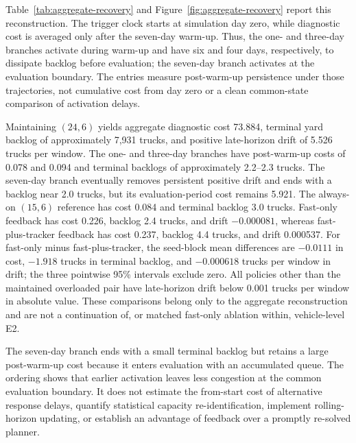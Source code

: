 \documentclass[preprint,12pt,authoryear,a4paper]{elsarticle}
\begin{document}
Table~\ref{tab:aggregate-recovery} and Figure~\ref{fig:aggregate-recovery} report this reconstruction. The trigger clock starts at simulation day zero, while diagnostic cost is averaged only after the seven-day warm-up. Thus, the one- and three-day branches activate during warm-up and have six and four days, respectively, to dissipate backlog before evaluation; the seven-day branch activates at the evaluation boundary. The entries measure post-warm-up persistence under those trajectories, not cumulative cost from day zero or a clean common-state comparison of activation delays.

Maintaining \((24,6)\) yields aggregate diagnostic cost 73.884, terminal yard backlog of approximately 7,931 trucks, and positive late-horizon drift of 5.526 trucks per window. The one- and three-day branches have post-warm-up costs of 0.078 and 0.094 and terminal backlogs of approximately 2.2--2.3 trucks. The seven-day branch eventually removes persistent positive drift and ends with a backlog near 2.0 trucks, but its evaluation-period cost remains 5.921. The always-on \((15,6)\) reference has cost 0.084 and terminal backlog 3.0 trucks. Fast-only feedback has cost 0.226, backlog 2.4 trucks, and drift \(-0.000081\), whereas fast-plus-tracker feedback has cost 0.237, backlog 4.4 trucks, and drift 0.000537. For fast-only minus fast-plus-tracker, the seed-block mean differences are \(-0.0111\) in cost, \(-1.918\) trucks in terminal backlog, and \(-0.000618\) trucks per window in drift; the three pointwise 95\% intervals exclude zero. All policies other than the maintained overloaded pair have late-horizon drift below 0.001 trucks per window in absolute value. These comparisons belong only to the aggregate reconstruction and are not a continuation of, or matched fast-only ablation within, vehicle-level E2.

The seven-day branch ends with a small terminal backlog but retains a large post-warm-up cost because it enters evaluation with an accumulated queue. The ordering shows that earlier activation leaves less congestion at the common evaluation boundary. It does not estimate the from-start cost of alternative response delays, quantify statistical capacity re-identification, implement rolling-horizon updating, or establish an advantage of feedback over a promptly re-solved planner.
\end{document}
